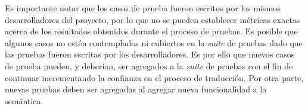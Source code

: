 Es importante notar que los casos de prueba fueron escritos por los mismos desarrolladores del proyecto, por lo que no se pueden establecer métricas exactas acerca de los resultados obtenidos durante el proceso de pruebas.
Es posible que algunos casos no estén contemplados ni cubiertos en la \textit{suite} de pruebas dado que las pruebas fueron escritas por los desarrolladores.
Es por ello que nuevos casos de prueba pueden, y deberían, ser agregados a la \textit{suite} de pruebas con el fin de continuar incrementando la confianza en el proceso de traducción.
Por otra parte, nuevas pruebas deben ser agregadas al agregar nueva funcionalidad a la semántica.
